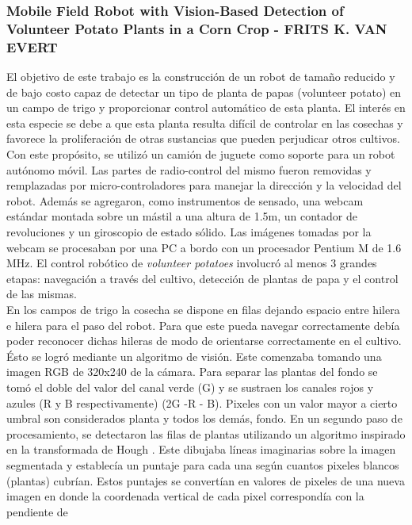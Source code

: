 	\subsubsection{\label{volunteer}Mobile Field Robot with Vision-Based Detection of Volunteer Potato Plants in a Corn Crop - FRITS K. VAN EVERT}
	El objetivo de este trabajo es la construcci\'on de un robot de 
	tama\~no reducido y de bajo costo capaz de detectar un tipo de 
	planta de papas (volunteer potato) en un campo de trigo y proporcionar control autom\'atico de esta planta. El inter\'es en 
	esta especie se debe a que esta planta resulta dif\'icil de controlar en las cosechas y favorece la 
	proliferaci\'on de otras sustancias que pueden perjudicar otros 
	cultivos. Con este prop\'osito, se utiliz\'o un cami\'on de juguete como 
	soporte para un robot aut\'onomo m\'ovil. Las partes de 
	radio-control del mismo fueron 
	removidas y remplazadas por micro-controladores para manejar la 
	direcci\'on y la velocidad del robot. Adem\'as se agregaron, como instrumentos de 
	sensado, una webcam est\'andar montada sobre un m\'astil a 
	una altura de 1.5m, un contador de revoluciones y un giroscopio de 
	estado s\'olido. Las im\'agenes tomadas por la webcam se procesaban 
	por una PC a bordo con un procesador Pentium M de 1.6 MHz. El control rob\'otico de \emph{volunteer potatoes} 
	involucr\'o al menos 3 grandes etapas: navegaci\'on a trav\'es del cultivo, detecci\'on 
	de plantas de papa y el control de las mismas.\\
	\indent En los campos de trigo la cosecha se dispone en filas 
	dejando espacio entre hilera e hilera para el paso del robot. Para 
	que este pueda navegar correctamente deb\'ia poder reconocer dichas 
	hileras de modo de orientarse correctamente en el cultivo. Ésto se 
	logr\'o mediante un algoritmo de visi\'on. Este comenzaba 
	tomando una imagen RGB de 320x240 de la c\'amara. Para separar las 
	plantas del fondo se tom\'o el doble del valor del canal verde (G)  y se 
	sustraen los canales rojos y azules (R y B respectivamente) (2G -R - B). Pixeles con un 
	valor mayor a cierto umbral son considerados planta y todos los 
	dem\'as, fondo. En un segundo paso de procesamiento, se detectaron las 
	filas de plantas utilizando un algoritmo inspirado en la 
	transformada de Hough \cite{hough62}. Este dibujaba l\'ineas imaginarias sobre la 
	imagen segmentada y establec\'ia un puntaje para cada una seg\'un 
	cuantos pixeles blancos (plantas) cubr\'ian. Estos puntajes se 
	convert\'ian en valores de pixeles de una nueva imagen en donde la 
	coordenada vertical de cada pixel correspond\'ia con la pendiente de 
